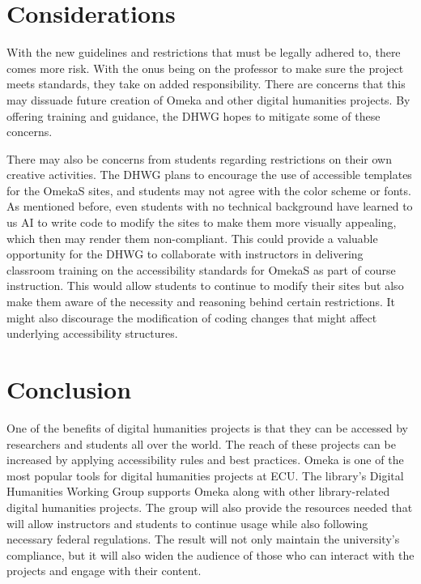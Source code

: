 \documentclass[final]{anthology-ch}
\begin{document}
\section{Considerations} \label{sec:considerations}

With the new guidelines and restrictions that must be legally adhered to, there comes more risk. With the onus being on the professor to make sure the project meets standards, they take on added responsibility. There are concerns that this may dissuade future creation of Omeka and other digital humanities projects. By offering training and guidance, the DHWG hopes to mitigate some of these concerns.

There may also be concerns from students regarding restrictions on their own creative activities. The DHWG plans to encourage the use of accessible templates for the OmekaS sites, and students may not agree with the color scheme or fonts. As mentioned before, even students with no technical background have learned to us AI to write code to modify the sites to make them more visually appealing, which then may render them non-compliant. This could provide a valuable opportunity for the DHWG to collaborate with instructors in delivering classroom training on the accessibility standards for OmekaS as part of course instruction. This would allow students to continue to modify their sites but also make them aware of the necessity and reasoning behind certain restrictions. It might also discourage the modification of coding changes that might affect underlying accessibility structures.

\section{Conclusion} \label{sec:conclusion}

One of the benefits of digital humanities projects is that they can be accessed by researchers and students all over the world. The reach of these projects can be increased by applying accessibility rules and best practices. Omeka is one of the most popular tools for digital humanities projects at ECU. The library's Digital Humanities Working Group supports Omeka along with other library-related digital humanities projects. The group will also provide the resources needed that will allow instructors and students to continue usage while also following necessary federal regulations. The result will not only maintain the university's compliance, but it will also widen the audience of those who can interact with the projects and engage with their content.

\printbibliography
\end{document}
